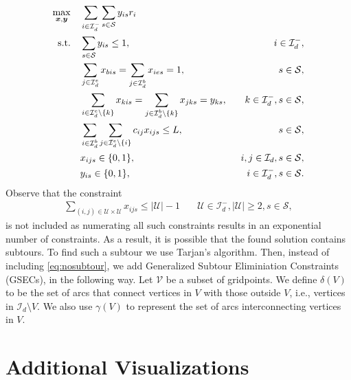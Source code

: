 \documentclass{article}
\newcommand{\set}[1]{\mathcal{#1}}
\begin{document}
\begin{subequations}
    \begin{align}
    \max_{\bm x, \bm y} &\quad \sum_{i \in \set I_d^-}  \sum_{s \in \set S} y_{is}r_{i} \\
    {\rm s.t. } &\quad \sum_{s \in \set S} y_{is} \leq 1, & i \in \set I_d^-, \\
    &\quad \sum_{j \in \set I_d^e} x_{bis} = \sum_{j \in \set I_d^b} x_{ies} = 1, &\quad s \in \set S, \\
    &\quad \sum_{i \in \set I_d^e \setminus \{k\}} x_{kis} = \sum_{j \in \set I_d^b \setminus \{k\}} x_{jks} = y_{ks}, &\quad k \in \set I_d^-, s \in \set S, \\
    &\quad \sum_{i \in \set I_d^b} \sum_{j \in \set I_d^e \setminus \{i\}} c_{ij} x_{ijs} \leq L, &\quad s \in \set S, \\
    &\quad x_{ijs} \in \{0,1\}, &i,j \in \set I_d, s \in \set S, \\
    &\quad y_{is} \in \{0,1\}, &i \in \set I_d^-, s \in \set S.
    \end{align}
\end{subequations}
Observe that the constraint
\begin{align}\label{eq:nosubtour}
    \sum_{(i,j) \in \set U \times \set U} x_{ijs} \leq \vert \set U \vert -1 &\quad \set U \in \set I_d^-, |\set U| \geq 2, s \in \set S,
\end{align}
is not included as numerating all such constraints results in an exponential number of constraints. As a result, it is possible that the found solution contains subtours. To find such a subtour we use Tarjan's algorithm. Then, instead of including \eqref{eq:nosubtour}, we add Generalized Subtour Eliminiation Constraints (GSECs), in the following way. Let $\set V$ be a subset of gridpoints. We define $\delta(V)$ to be the set of arcs that connect vertices in $V$ with those outside $V$, i.e., vertices in $\set I_d \setminus V$. We also use $\gamma(V)$ to represent the set of arcs interconnecting vertices in $V$. 

\fi

\section{Additional Visualizations}


\end{document}
